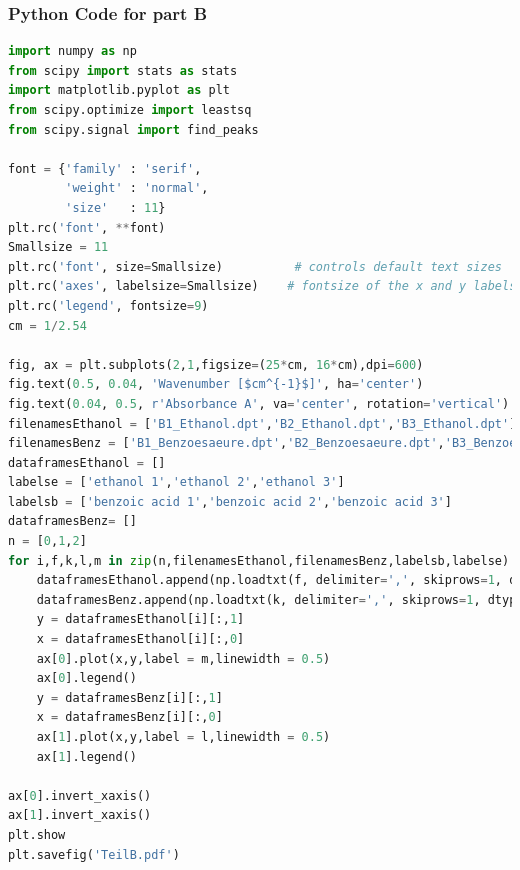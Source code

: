 \documentclass[a4paper,abstracton]{article}	                       %
\begin{document}
\subsubsection*{Python Code for part B}
\begin{lstlisting}[language=Python]
import numpy as np
from scipy import stats as stats
import matplotlib.pyplot as plt
from scipy.optimize import leastsq
from scipy.signal import find_peaks

font = {'family' : 'serif',
        'weight' : 'normal',
        'size'   : 11}
plt.rc('font', **font)
Smallsize = 11
plt.rc('font', size=Smallsize)          # controls default text sizes
plt.rc('axes', labelsize=Smallsize)    # fontsize of the x and y labels
plt.rc('legend', fontsize=9)  
cm = 1/2.54

fig, ax = plt.subplots(2,1,figsize=(25*cm, 16*cm),dpi=600)   
fig.text(0.5, 0.04, 'Wavenumber [$cm^{-1}$]', ha='center')
fig.text(0.04, 0.5, r'Absorbance A', va='center', rotation='vertical')
filenamesEthanol = ['B1_Ethanol.dpt','B2_Ethanol.dpt','B3_Ethanol.dpt']
filenamesBenz = ['B1_Benzoesaeure.dpt','B2_Benzoesaeure.dpt','B3_Benzoesaeure.dpt']
dataframesEthanol = []
labelse = ['ethanol 1','ethanol 2','ethanol 3']
labelsb = ['benzoic acid 1','benzoic acid 2','benzoic acid 3']
dataframesBenz= []
n = [0,1,2]
for i,f,k,l,m in zip(n,filenamesEthanol,filenamesBenz,labelsb,labelse):
    dataframesEthanol.append(np.loadtxt(f, delimiter=',', skiprows=1, dtype=float))
    dataframesBenz.append(np.loadtxt(k, delimiter=',', skiprows=1, dtype=float))
    y = dataframesEthanol[i][:,1]
    x = dataframesEthanol[i][:,0]
    ax[0].plot(x,y,label = m,linewidth = 0.5)
    ax[0].legend()
    y = dataframesBenz[i][:,1]
    x = dataframesBenz[i][:,0]
    ax[1].plot(x,y,label = l,linewidth = 0.5)
    ax[1].legend()

ax[0].invert_xaxis()
ax[1].invert_xaxis()
plt.show
plt.savefig('TeilB.pdf')
\end{lstlisting}
\end{document}
